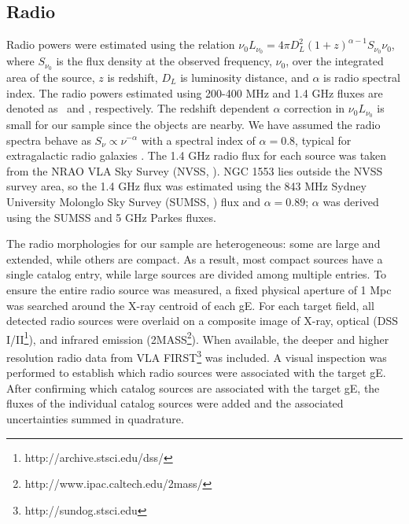 \documentclass{emulateapj}
\begin{document}
\subsection{Radio}
\label{sec:radio}

Radio powers were estimated using the relation $\nu_0 L_{\nu_0} = 4
\pi D_L^2 (1+z)^{\alpha-1} S_{\nu_0} \nu_0$, where $S_{\nu_0}$ is the
flux density at the observed frequency, $\nu_0$, over the integrated
area of the source, $z$ is redshift, $D_L$ is luminosity distance, and
$\alpha$ is radio spectral index. The radio powers estimated using
200-400 MHz and 1.4 GHz fluxes are denoted as \plow\ and \phigh,
respectively. The redshift dependent $\alpha$ correction in $\nu_0
L_{\nu_0}$ is small for our sample since the objects are nearby. We
have assumed the radio spectra behave as $S_{\nu} \propto
\nu^{-\alpha}$ with a spectral index of $\alpha = 0.8$, typical for
extragalactic radio galaxies \citep{1992ARA&A..30..575C}. The 1.4 GHz
radio flux for each source was taken from the NRAO VLA Sky Survey
(NVSS, \citealt{nvss}). NGC 1553 lies outside the NVSS survey area, so
the 1.4 GHz flux was estimated using the 843 MHz Sydney University
Molonglo Sky Survey (SUMSS, \citealt{sumss1}) flux and $\alpha =
0.89$; $\alpha$ was derived using the SUMSS and 5 GHz Parkes
\citep{1970ApL.....5...29W} fluxes.

The radio morphologies for our sample are heterogeneous: some are
large and extended, while others are compact. As a result, most
compact sources have a single catalog entry, while large sources are
divided among multiple entries. To ensure the entire radio source was
measured, a fixed physical aperture of 1 Mpc was searched around the
X-ray centroid of each gE. For each target field, all detected radio
sources were overlaid on a composite image of X-ray, optical (DSS
I/II\footnote{http://archive.stsci.edu/dss/}), and infrared emission
(2MASS\footnote{http://www.ipac.caltech.edu/2mass/}). When available,
the deeper and higher resolution radio data from VLA
FIRST\footnote{http://sundog.stsci.edu} was included. A visual
inspection was performed to establish which radio sources were
associated with the target gE. After confirming which catalog sources
are associated with the target gE, the fluxes of the individual
catalog sources were added and the associated uncertainties summed in
quadrature.
\end{document}

